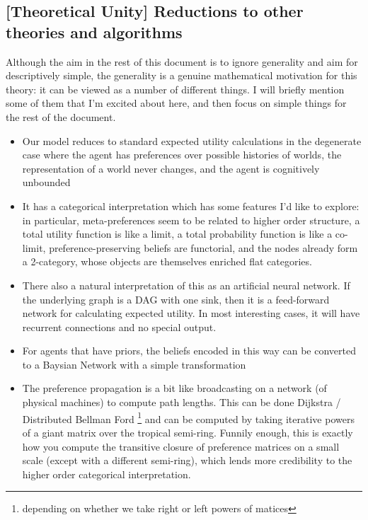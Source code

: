 \documentclass{article}
\begin{document}
	\subsection*{[Theoretical Unity] Reductions to other theories and algorithms}
	Although the aim in the rest of this document is to ignore generality and aim for descriptively simple, the generality is a genuine mathematical motivation for this theory: it can be viewed as a number of different things. I will briefly mention some of them that I'm excited about here, and then focus on simple things for the rest of the document.
	\begin{itemize}[nosep]
		\item Our model reduces to standard expected utility calculations in the degenerate case where the agent has preferences over possible histories of worlds, the representation of a world never changes, and the agent is cognitively unbounded
		\item It has a categorical interpretation which has some features I'd like to explore: in particular, meta-preferences seem to be related to higher order structure, a total utility function is like a limit, a total probability function is like a co-limit, preference-preserving beliefs are functorial, and the nodes already form a 2-category, whose objects are themselves enriched flat categories.
		\item There also a natural interpretation of this as an artificial neural network. If the underlying graph is a DAG with one sink, then it is a feed-forward network for calculating expected utility. In most interesting cases, it will have recurrent connections and no special output.
		\item For agents that have priors, the beliefs encoded in this way can be converted to a Baysian Network with a simple transformation
		\item The preference propagation is a bit like broadcasting on a network (of physical machines) to compute path lengths. This can be done Dijkstra / Distributed Bellman Ford \footnote{depending on whether we take right or left powers of matices} and can be computed by taking iterative powers of a giant matrix over the tropical semi-ring. Funnily enough, this is exactly how you compute the transitive closure of preference matrices on a small scale (except with a different semi-ring), which lends more credibility to the higher order categorical interpretation.
	\end{itemize}
\end{document}
